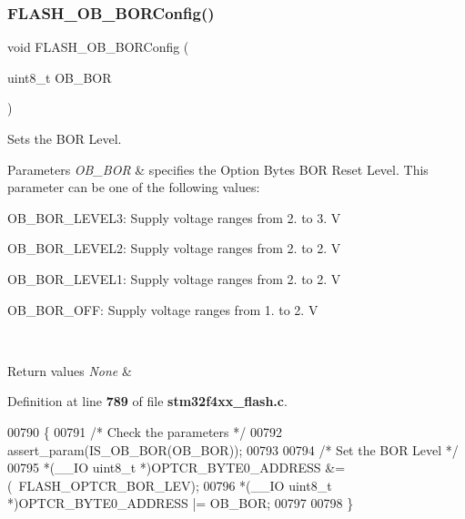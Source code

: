 \subsubsection{F\+L\+A\+S\+H\+\_\+\+O\+B\+\_\+\+B\+O\+R\+Config()}
{\footnotesize\ttfamily void F\+L\+A\+S\+H\+\_\+\+O\+B\+\_\+\+B\+O\+R\+Config (\begin{DoxyParamCaption}\item[{uint8\+\_\+t}]{O\+B\+\_\+\+B\+OR }\end{DoxyParamCaption})}



Sets the B\+OR Level. 


\begin{DoxyParams}{Parameters}
{\em O\+B\+\_\+\+B\+OR} & specifies the Option Bytes B\+OR Reset Level. This parameter can be one of the following values\+: \begin{DoxyItemize}
\item O\+B\+\_\+\+B\+O\+R\+\_\+\+L\+E\+V\+E\+L3\+: Supply voltage ranges from 2. to 3. V \item O\+B\+\_\+\+B\+O\+R\+\_\+\+L\+E\+V\+E\+L2\+: Supply voltage ranges from 2. to 2. V \item O\+B\+\_\+\+B\+O\+R\+\_\+\+L\+E\+V\+E\+L1\+: Supply voltage ranges from 2. to 2. V \item O\+B\+\_\+\+B\+O\+R\+\_\+\+O\+FF\+: Supply voltage ranges from 1. to 2. V \end{DoxyItemize}
\\
\hline
\end{DoxyParams}

\begin{DoxyRetVals}{Return values}
{\em None} & \\
\hline
\end{DoxyRetVals}


Definition at line \textbf{ 789} of file \textbf{ stm32f4xx\+\_\+flash.\+c}.


\begin{DoxyCode}
00790 \{
00791   \textcolor{comment}{/* Check the parameters */}
00792   assert_param(IS_OB_BOR(OB\_BOR));
00793 
00794   \textcolor{comment}{/* Set the BOR Level */}
00795   *(\_\_IO uint8\_t *)OPTCR_BYTE0_ADDRESS &= (~FLASH_OPTCR_BOR_LEV);
00796   *(\_\_IO uint8\_t *)OPTCR_BYTE0_ADDRESS |= OB\_BOR;
00797 
00798 \}
\end{DoxyCode}
\mbox{\label{group__FLASH__Group3_gab8a8804905929b2edd544d28c2e7b215}} 
